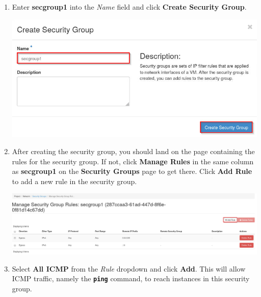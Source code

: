 \documentclass[letterpaper, 12pt]{article}
\begin{document}
\begin{enumerate}
    \item Enter \textbf{secgroup1} into the \textit{Name} field and click \textbf{Create Security Group}.

    \begin{center}
        \includegraphics[width=\linewidth]{images/part4/step5.png}
    \end{center}

    \item After creating the security group, you should land on the page containing the rules for the security group.
    If not, click \textbf{Manage Rules} in the same column as \textbf{secgroup1} on the \textbf{Security Groups} page to
    get there. Click \textbf{Add Rule} to add a new rule in the security group.

    \begin{center}
        \includegraphics[width=\linewidth]{images/part4/step6.png}
    \end{center}

    \item Select \textbf{All ICMP} from the \textit{Rule} dropdown and click \textbf{Add}. This will allow ICMP traffic,
    namely the \textbf{\texttt{ping}} command, to reach instances in this security group.


\end{enumerate}
\end{document}
